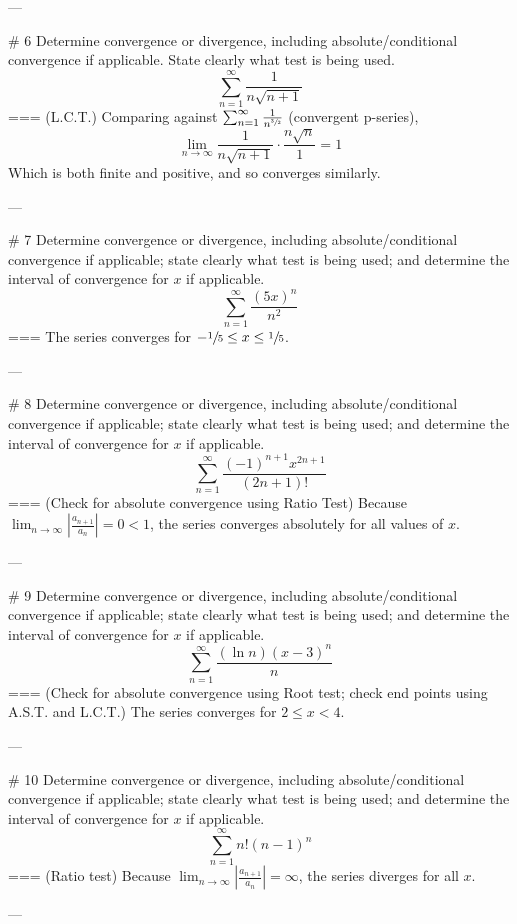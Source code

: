 ---

# 6
Determine convergence or divergence, including absolute/conditional convergence
if applicable. State clearly what test is being used.
\[\sum_{n=1}^\infty \frac{1}{n\sqrt{n+1}}\]
===
(L.C.T.) Comparing against \(\sum_{n=1}^\infty \frac{1}{n^{\sfrac{3}{2}}}\)
(convergent p-series),
\[\lim_{n\to\infty}\frac{1}{n\sqrt{n+1}}\cdot\frac{n\sqrt{n}}{1}=1\]
Which is both finite and positive, and so converges similarly.

---

# 7
Determine convergence or divergence, including absolute/conditional convergence
if applicable; state clearly what test is being used; and determine the interval
of convergence for \(x\) if applicable.
\[\sum_{n=1}^\infty\frac{{(5x)}^n}{n^2}\]
===
The series converges for \(-\sfrac{1}{5}\leq x\leq\sfrac{1}{5}\).

---

# 8
Determine convergence or divergence, including absolute/conditional convergence
if applicable; state clearly what test is being used; and determine the interval
of convergence for \(x\) if applicable.
\[\sum_{n=1}^\infty\frac{{(-1)}^{n+1}x^{2n+1}}{(2n+1)!}\]
===
(Check for absolute convergence using Ratio Test)
Because \(\lim_{n\to\infty}\left|\frac{a_{n+1}}{a_n}\right|=0<1\), the series
converges absolutely for all values of \(x\).

---

# 9
Determine convergence or divergence, including absolute/conditional convergence
if applicable; state clearly what test is being used; and determine the interval
of convergence for \(x\) if applicable.
\[\sum_{n=1}^\infty\frac{(\ln n){(x-3)}^n}{n}\]
===
(Check for absolute convergence using Root test; check end points using A.S.T.
and L.C.T.) The series converges for \(2\leq x<4\).

---

# 10
Determine convergence or divergence, including absolute/conditional convergence
if applicable; state clearly what test is being used; and determine the interval
of convergence for \(x\) if applicable.
\[\sum_{n=1}^\infty n!{(n-1)}^n\]
===
(Ratio test) Because
\(\lim_{n\to\infty}\left|\frac{a_{n+1}}{a_n}\right|=\infty\), the series
diverges for all \(x\).

---

